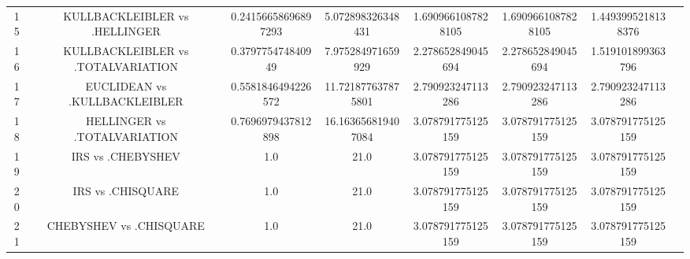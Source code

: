 \documentclass[a4paper,10pt]{article}
\begin{document}
\begin{landscape}
\begin{table}[!htp]
\begin{tabular}{cccccccc}
15&KULLBACKLEIBLER vs .HELLINGER&0.24156658696897293&5.072898326348431&1.6909661087828105&1.6909661087828105&1.4493995218138376\\
16&KULLBACKLEIBLER vs .TOTALVARIATION&0.379775474840949&7.975284971659929&2.278652849045694&2.278652849045694&1.519101899363796\\
17&EUCLIDEAN vs .KULLBACKLEIBLER&0.5581846494226572&11.721877637875801&2.790923247113286&2.790923247113286&2.790923247113286\\
18&HELLINGER vs .TOTALVARIATION&0.7696979437812898&16.163656819407084&3.078791775125159&3.078791775125159&3.078791775125159\\
19&IRS vs .CHEBYSHEV&1.0&21.0&3.078791775125159&3.078791775125159&3.078791775125159\\
20&IRS vs .CHISQUARE&1.0&21.0&3.078791775125159&3.078791775125159&3.078791775125159\\
21&CHEBYSHEV vs .CHISQUARE&1.0&21.0&3.078791775125159&3.078791775125159&3.078791775125159\\
\hline
\end{tabular}
\end{table}

\end{landscape}
\end{document}
